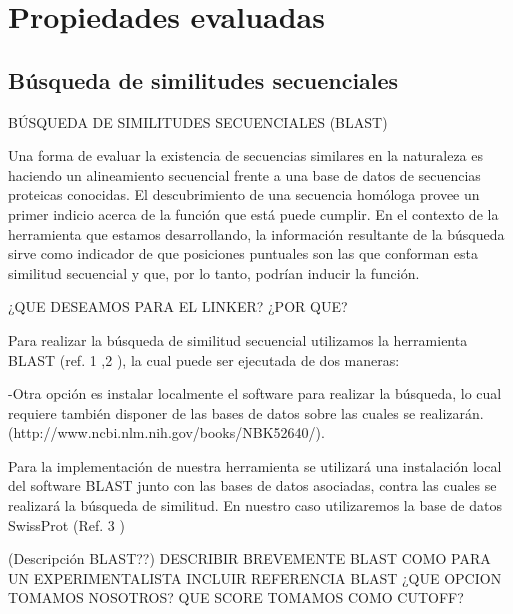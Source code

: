 \chapter{Propiedades evaluadas}

\section{Búsqueda de similitudes secuenciales}

BÚSQUEDA DE SIMILITUDES SECUENCIALES (BLAST)

Una forma de evaluar la existencia de secuencias similares en la naturaleza es haciendo un alineamiento secuencial frente a una base de datos de secuencias proteicas conocidas. El descubrimiento de una secuencia homóloga provee un primer indicio acerca de la función que está puede cumplir. En el contexto de la herramienta que estamos desarrollando, la información resultante de la búsqueda sirve como indicador de que posiciones puntuales son las que conforman esta similitud secuencial y que, por lo tanto, podrían inducir la función. 

¿QUE DESEAMOS PARA EL LINKER? ¿POR QUE?

Para realizar la búsqueda de similitud secuencial utilizamos la herramienta BLAST (ref. 1 ,2 ), la cual puede ser ejecutada de dos maneras:

 
    -Otra opción es instalar localmente el software para realizar la búsqueda, lo cual requiere también disponer de las bases de datos sobre las cuales se realizarán. (http://www.ncbi.nlm.nih.gov/books/NBK52640/).

Para la implementación de nuestra herramienta se utilizará una instalación local del software BLAST junto con las bases de datos asociadas, contra las cuales se realizará la búsqueda de similitud. En nuestro caso utilizaremos la base de datos SwissProt (Ref. 3 )

(Descripción BLAST??)
DESCRIBIR BREVEMENTE BLAST COMO PARA UN EXPERIMENTALISTA
INCLUIR REFERENCIA BLAST
¿QUE OPCION TOMAMOS NOSOTROS?
QUE SCORE TOMAMOS COMO CUTOFF?


